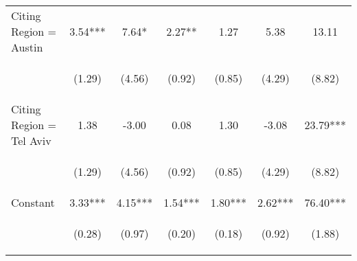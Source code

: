 \begin{center}
\begin{tabular}{lcccccc}
Citing Region = Austin & 3.54*** & 7.64* & 2.27** & 1.27 & 5.38 & 13.11 \\
\vspace{4pt} & \begin{footnotesize}(1.29)\end{footnotesize} & \begin{footnotesize}(4.56)\end{footnotesize} & \begin{footnotesize}(0.92)\end{footnotesize} & \begin{footnotesize}(0.85)\end{footnotesize} & \begin{footnotesize}(4.29)\end{footnotesize} & \begin{footnotesize}(8.82)\end{footnotesize} \\
Citing Region = Tel Aviv & 1.38 & -3.00 & 0.08 & 1.30 & -3.08 & 23.79*** \\
\vspace{4pt} & \begin{footnotesize}(1.29)\end{footnotesize} & \begin{footnotesize}(4.56)\end{footnotesize} & \begin{footnotesize}(0.92)\end{footnotesize} & \begin{footnotesize}(0.85)\end{footnotesize} & \begin{footnotesize}(4.29)\end{footnotesize} & \begin{footnotesize}(8.82)\end{footnotesize} \\
Constant & 3.33*** & 4.15*** & 1.54*** & 1.80*** & 2.62*** & 76.40*** \\
 & \begin{footnotesize}(0.28)\end{footnotesize} & \begin{footnotesize}(0.97)\end{footnotesize} & \begin{footnotesize}(0.20)\end{footnotesize} & \begin{footnotesize}(0.18)\end{footnotesize} & \begin{footnotesize}(0.92)\end{footnotesize} & \begin{footnotesize}(1.88)\end{footnotesize} \\

\end{tabular}
\end{center}
